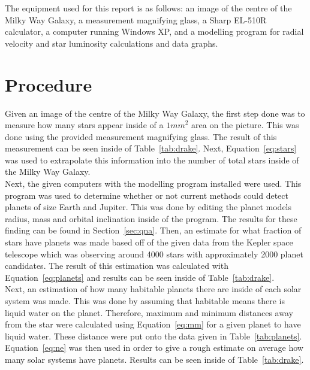 \documentclass{article}
\begin{document}
The equipment used for this report is as follows: an image of the centre of the Milky Way Galaxy, a measurement magnifying glass,
 a Sharp EL-510R calculator, a computer running Windows XP, and a modelling program for radial velocity and star luminosity 
calculations and data graphs.


\section{Procedure}
\label{sec:proc}

Given an image of the centre of the Milky Way Galaxy, the first step done was to measure how many stars appear inside of a ${1mm}^{2}$
area on the picture. This was done using the provided measurement magnifying glass. The result of this measurement can be seen inside of
Table~\ref{tab:drake}. Next, Equation~\ref{eq:stars} was used to extrapolate this information into the number of total stars inside of the 
Milky Way Galaxy.\\

Next, the given computers with the modelling program installed were used. This program was used to determine whether or not current 
methods could detect planets of size Earth and Jupiter. This was done by editing the planet models radius, mass and orbital inclination inside
of the program. The results for these finding can be found in Section~\ref{sec:qna}. Then, an estimate for what fraction of stars have planets
was made based off of the given data from the Kepler space telescope which was observing around 4000 stars with approximately 2000 planet
candidates. The result of this estimation was calculated with Equation~\ref{eq:planets} and results can be seen inside of Table~\ref{tab:drake}.\\

Next, an estimation of how many habitable planets there are inside of each solar system was made. This was done by assuming that habitable means there
is liquid water on the planet. Therefore, maximum and minimum distances away from the star were calculated using Equation~\ref{eq:mm} for a given
planet to have liquid water. These distance were put onto the data given in Table~\ref{tab:planets}. Equation~\ref{eq:ne} was then used in order to give 
a rough estimate on average how many solar systems have planets. Results can be seen inside of Table~\ref{tab:drake}.\\
\end{document}
